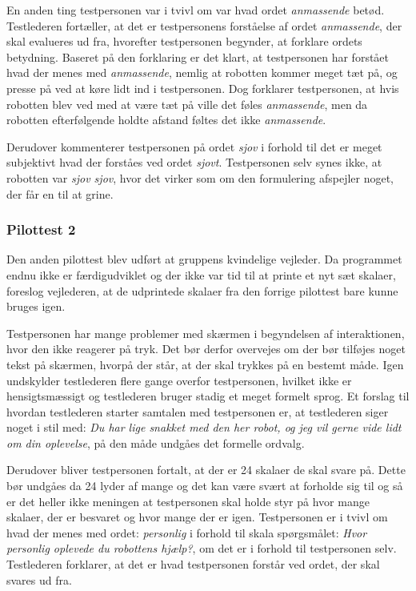 En anden ting testpersonen var i tvivl om var hvad ordet \textit{anmassende} betød. Testlederen fortæller, at det er testpersonens forståelse af ordet \textit{anmassende}, der skal evalueres ud fra, hvorefter testpersonen begynder, at forklare ordets betydning. Baseret på den forklaring er det klart, at testpersonen har forstået hvad der menes med \textit{anmassende}, nemlig at robotten kommer meget tæt på, og presse på ved at køre lidt ind i testpersonen. Dog forklarer testpersonen, at hvis robotten blev ved med at være tæt på ville det føles \textit{anmassende}, men da robotten efterfølgende holdte afstand føltes det ikke \textit{anmassende}.

Derudover kommenterer testpersonen på ordet \textit{sjov} i forhold til det er meget subjektivt hvad der forståes ved ordet \textit{sjovt}. Testpersonen selv synes ikke, at robotten var \textit{sjov sjov}, hvor det virker som om den formulering afspejler noget, der får en til at grine.

\subsubsection*{Pilottest 2}
\label{TestAfSkalaerPilot2}
%
Den anden pilottest blev udført at gruppens kvindelige vejleder. Da programmet endnu ikke er færdigudviklet og der ikke var tid til at printe et nyt sæt skalaer, foreslog vejlederen, at de udprintede skalaer fra den forrige pilottest bare kunne bruges igen. 

Testpersonen har mange problemer med skærmen i begyndelsen af interaktionen, hvor den ikke reagerer på tryk. Det bør derfor overvejes om der bør tilføjes noget tekst på skærmen, hvorpå der står, at der skal trykkes på en bestemt måde. Igen undskylder testlederen flere gange overfor testpersonen, hvilket ikke er hensigtsmæssigt og testlederen bruger stadig et meget formelt sprog. Et forslag til hvordan testlederen starter samtalen med testpersonen er, at testlederen siger noget i stil med: \textit{Du har lige snakket med den her robot, og jeg vil gerne vide lidt om din oplevelse}, på den måde undgåes det formelle ordvalg. 

Derudover bliver testpersonen fortalt, at der er 24 skalaer de skal svare på. Dette bør undgåes da 24 lyder af mange og det kan være svært at forholde sig til og så er det heller ikke meningen at testpersonen skal holde styr på hvor mange skalaer, der er besvaret og hvor mange der er igen.\blankline     
%
Testpersonen er i tvivl om hvad der menes med ordet: \textit{personlig} i forhold til skala spørgsmålet: \textit{Hvor personlig oplevede du robottens hjælp?}, om det er i forhold til testpersonen selv. Testlederen forklarer, at det er hvad testpersonen forstår ved ordet, der skal svares ud fra.

